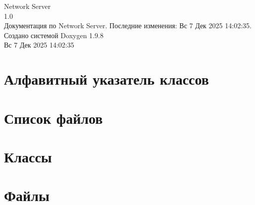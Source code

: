 \documentclass[twoside]{book}
\newcommand{\+}{\discretionary{\mbox{\scriptsize$\hookleftarrow$}}{}{}}
\newcommand{\clearemptydoublepage}{%
    \newpage{\pagestyle{empty}\cleardoublepage}%
  }
\begin{document}
  \raggedbottom
    \hypersetup{pageanchor=false,
                bookmarksnumbered=true,
                pdfencoding=unicode
               }
  \begin{titlepage}
  \vspace*{7cm}
  \begin{center}%
  {\Large Network Server}\\
  [1ex]\large 1.\+0 \\
  \vspace*{1cm}
  {\large Документация по Network Server. Последние изменения\+: Вс 7 Дек 2025 14\+:02\+:35. Создано системой Doxygen 1.9.8}\\
    \vspace*{0.5cm}
    {\small Вс 7 Дек 2025 14:02:35}
  \end{center}
  \end{titlepage}
  \clearemptydoublepage
  \tableofcontents
  \clearemptydoublepage
  \hypersetup{pageanchor=true}
\chapter{Алфавитный указатель классов}

\chapter{Список файлов}

\chapter{Классы}







\chapter{Файлы}



















  \backmatter
  \newpage
  \clearemptydoublepage
  \printindex
\end{document}
